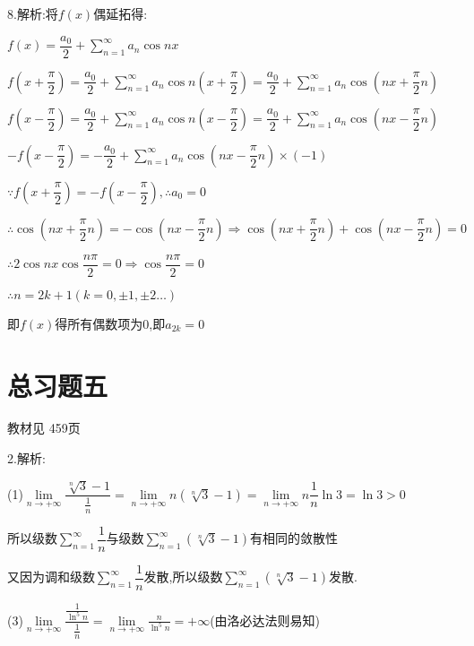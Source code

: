 8.解析:将$f(x)$偶延拓得:

$f(x) = \dfrac{{{a_0}}}{2} + \sum\limits_{n = 1}^\infty  {{a_n}\cos nx} $

$f(x + \dfrac{\pi }{2}) = \dfrac{{{a_0}}}{2} + \sum\limits_{n = 1}^\infty  {{a_n}\cos n(x + \dfrac{\pi }{2})}  = \dfrac{{{a_0}}}{2} + \sum\limits_{n = 1}^\infty  {{a_n}\cos (nx + \dfrac{\pi }{2}n)} $

$f(x - \dfrac{\pi }{2}) = \dfrac{{{a_0}}}{2} + \sum\limits_{n = 1}^\infty  {{a_n}\cos n(x - \dfrac{\pi }{2})} = \dfrac{{{a_0}}}{2} + \sum\limits_{n = 1}^\infty  {{a_n}\cos (nx - \dfrac{\pi }{2}n)} $

$ - f(x - \dfrac{\pi }{2}) =  - \dfrac{{{a_0}}}{2} + \sum\limits_{n = 1}^\infty  {{a_n}\cos (nx - \dfrac{\pi }{2}n) \times ( - 1)} $

$\because f(x + \dfrac{\pi }{2}) =  - f(x - \dfrac{\pi }{2}),\therefore {a_0} = 0$

$\therefore \cos (nx + \dfrac{\pi }{2}n) =  - \cos (nx - \dfrac{\pi }{2}n) \Rightarrow \cos (nx + \dfrac{\pi }{2}n) + \cos (nx - \dfrac{\pi }{2}n) = 0$

$\therefore 2\cos nx\cos \dfrac{{n\pi }}{2} = 0 \Rightarrow \cos \dfrac{{n\pi }}{2} = 0$

$\therefore n = 2k + 1(k = 0, \pm 1, \pm 2 \ldots )$

即$f(x)$得所有偶数项为0,即${a_{2k}} = 0$

\section{总习题五}
\begin{flushright}
  \color{zhanqing!80}
   教材见 459页 %
\end{flushright}

2.解析:

(1)$\lim\limits_{n \to +\infty} \dfrac{{\sqrt[n]{3} - 1}}{{\frac{1}{n}}} = \lim\limits_{n \to +\infty} n\left( {\sqrt[n]{3} - 1} \right) = \lim\limits_{n \to +\infty} n\dfrac{1}{n}\ln 3 = \ln 3 > 0$

所以级数$\sum\limits_{n = 1}^\infty  {\dfrac{1}{n}} $与级数$\sum\limits_{n = 1}^\infty  {\left( {\sqrt[n]{3} - 1} \right)} $有相同的敛散性

又因为调和级数$\sum\limits_{n = 1}^\infty  {\dfrac{1}{n}} $发散,所以级数$\sum\limits_{n = 1}^\infty  {\left( {\sqrt[n]{3} - 1} \right)} $发散.

(3)$\lim\limits_{n \to +\infty} \dfrac{{\frac{1}{{{{\ln }^5}n}}}}{{\frac{1}{n}}} = \lim\limits_{n \to +\infty} \frac{n}{{{{\ln }^5}n}} =  + \infty $(由洛必达法则易知)

